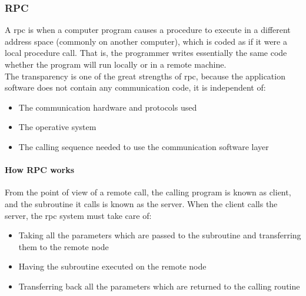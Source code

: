 \documentclass[a4paper, 12pt]{article} %
\begin{document}
        \subsubsection{RPC}
            A \acrfull{rpc}\cite{rpc} is when a computer program causes a procedure to execute in a different address space (commonly on another computer), which is coded as if it were a local procedure call. That is, the programmer writes essentially the same code whether the program will run locally or in a remote machine.\\
            
            The transparency is one of the great strengths of \acrshort{rpc}, because the application software does not contain any communication code, it is independent of:
            \begin{itemize}
                \item The communication hardware and protocols used
                \item The operative system
                \item The calling sequence needed to use the communication software layer
            \end{itemize}
            
            \paragraph{How RPC works}
                From the point of view of a remote call, the calling program is known as client, and the subroutine it calls is known as the server\cite{rpcInOS,howRPC}. When the client calls the server, the \acrshort{rpc} system must take care of:
                \begin{itemize}
                    \item Taking all the parameters which are passed to the subroutine and transferring them to the remote node
                    \item Having the subroutine executed on the remote node
                    \item Transferring back all the parameters which are returned to the calling routine
                \end{itemize}
                
\end{document}

